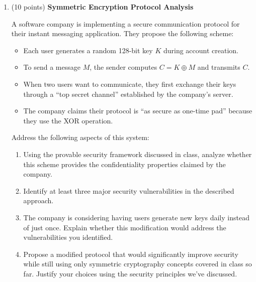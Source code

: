 \documentclass[10pt,a4paper,american]{article}
\begin{document}
\begin{enumerate}
	\item (10 points) \textbf{Symmetric Encryption Protocol Analysis}

	      A software company is implementing a secure communication protocol for their instant messaging application. They propose the following scheme:

	      \begin{itemize}
		      \item Each user generates a random 128-bit key $K$ during account creation.
		      \item To send a message $M$, the sender computes $C = K \oplus M$ and transmits $C$.
		      \item When two users want to communicate, they first exchange their keys through a ``top secret channel'' established by the company's server.
		      \item The company claims their protocol is ``as secure as one-time pad'' because they use the XOR operation.
	      \end{itemize}

	      Address the following aspects of this system:
	      \begin{enumerate}
		      \item Using the provable security framework discussed in class, analyze whether this scheme provides the confidentiality properties claimed by the company.
		      \item Identify at least three major security vulnerabilities in the described approach.
		      \item The company is considering having users generate new keys daily instead of just once. Explain whether this modification would address the vulnerabilities you identified.
		      \item Propose a modified protocol that would significantly improve security while still using only symmetric cryptography concepts covered in class so far. Justify your choices using the security principles we've discussed.
	      \end{enumerate}
\end{enumerate}
\end{document}

